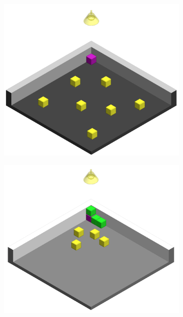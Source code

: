 \begin{figure}[h]  
	\centering
	
	\begin{subfigure}[b]{0.3\linewidth}
		\includegraphics[width=0.9\linewidth]{figures/light_1.png}
		\subcaption{} 
	\end{subfigure}
	\begin{subfigure}[b]{0.3\linewidth}
		\includegraphics[width=0.9\linewidth]{figures/light_2.png}
		\subcaption{} 
	\end{subfigure}
	\begin{subfigure}[b]{0.3\linewidth}

\end{subfigure}
\end{figure}

